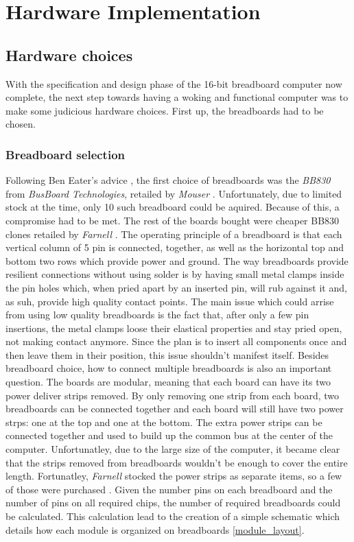 \chapter{Hardware Implementation}

\section{Hardware choices}
With the specification and design phase of the 16-bit breadboard computer now complete,
the next step towards having a woking and functional computer was to make some judicious
hardware choices. First up, the breadboards had to be chosen.

\subsection{Breadboard selection}
Following Ben Eater's advice \cite{eater2020breaboards}, the first choice of breadboards
was the \emph{BB830} from \emph{BusBoard Technologies}, retailed by \emph{Mouser}
\cite{mouser2020breadboards}. Unfortunately, due to limited stock at the time, only 10 such
breadboard could be aquired. Because of this, a compromise had to be met. The rest of the boards
bought were cheaper BB830 clones retailed by \emph{Farnell} \cite{farnell2020breadboards}.
The operating principle of a breadboard is that each vertical column of 5 pin is connected,
together, as well as the horizontal top and bottom two rows which provide power and ground.
The way breadboards provide resilient connections without using solder is by having small metal
clamps inside the pin holes which, when pried apart by an inserted pin, will rub against it
and, as suh, provide high quality contact points. The main issue which could arrise from using
low quality breadboards is the fact that, after only a few pin insertions, the metal clamps
loose their elastical properties and stay pried open, not making contact anymore. Since the plan
is to insert all components once and then leave them in their position, this issue shouldn't
manifest itself.
Besides breadboard choice, how to connect multiple breadboards is also an important question.
The boards are modular, meaning that each board can have its two power deliver strips removed.
By only removing one strip from each board, two breadboards can be connected together and each
board will still have two power strps: one at the top and one at the bottom. The extra power strips
can be connected together and used to build up the common bus at the center of the computer.
Unfortunatley, due to the large size of the computer, it became clear that the strips removed
from breadboards wouldn't be enough to cover the entire length. Fortunatley, \emph{Farnell} stocked
the power strips as separate items, so a few of those were purchased \cite{farnell2020strips}.
Given the number pins on each breadboard and the number of pins on all required chips, the number
of required breadboards could be calculated. This calculation lead to the creation of a simple
schematic which details how each module is organized on breadboards \ref{module_layout}.

